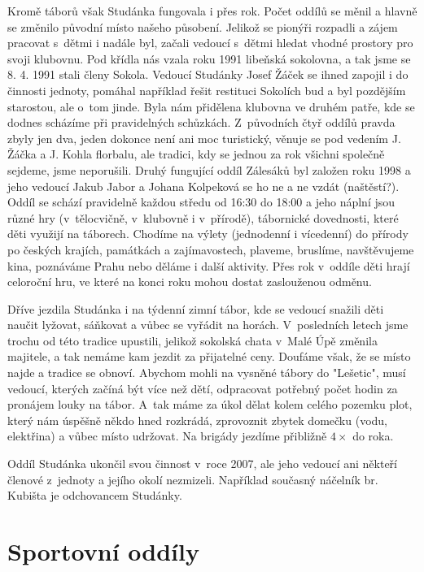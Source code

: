 \documentclass[a5paper, 11pt, twoside]{article}
\begin{document}
Kromě táborů však Studánka fungovala i přes rok. Počet oddílů se měnil a
hlavně se změnilo původní místo našeho působení. Jelikož se pionýři
rozpadli a zájem pracovat s~dětmi i nadále byl, začali vedoucí s~dětmi
hledat vhodné prostory pro svoji klubovnu. Pod křídla nás vzala roku
1991 libeňská sokolovna, a tak jsme se 8. 4. 1991 stali členy Sokola.
Vedoucí Studánky Josef Žáček se ihned zapojil i do činnosti jednoty,
pomáhal například řešit restituci Sokolích bud a byl pozdějším
starostou, ale o~tom jinde. Byla nám přidělena klubovna ve druhém patře,
kde se dodnes scházíme při pravidelných schůzkách. Z~původních čtyř
oddílů pravda zbyly jen dva, jeden dokonce není ani moc turistický,
věnuje se pod vedením J. Žáčka a J. Kohla florbalu, ale tradici, kdy se
jednou za rok všichni společně sejdeme, jsme neporušili. Druhý fungující
oddíl Zálesáků byl založen roku 1998 a jeho vedoucí Jakub Jabor a Johana
Kolpeková se ho ne a ne vzdát (naštěstí?). Oddíl se schází pravidelně
každou středu od 16:30 do 18:00 a jeho náplní jsou různé hry
(v~tělocvičně, v~klubovně i v~přírodě), tábornické dovednosti, které děti
využijí na táborech. Chodíme na výlety (jednodenní i vícedenní) do
přírody po českých krajích, památkách a zajímavostech, plaveme,
bruslíme, navštěvujeme kina, poznáváme Prahu nebo děláme i další
aktivity. Přes rok v~oddíle děti hrají celoroční hru, ve které na konci
roku mohou dostat zaslouženou odměnu.

Dříve jezdila Studánka i na týdenní zimní tábor, kde se vedoucí snažili
děti naučit lyžovat, sáňkovat a vůbec se vyřádit na horách. V~posledních
letech jsme trochu od této tradice upustili, jelikož sokolská chata
v~Malé Úpě změnila majitele, a tak nemáme kam jezdit za přijatelné ceny.
Doufáme však, že se místo najde a tradice se obnoví. Abychom mohli na
vysněné tábory do "Lešetic", musí vedoucí, kterých začíná být více než
dětí, odpracovat potřebný počet hodin za pronájem louky na tábor. A~tak
máme za úkol dělat kolem celého pozemku plot, který nám úspěšně někdo
hned rozkrádá, zprovoznit zbytek domečku (vodu, elektřina) a vůbec místo
udržovat. Na brigády jezdíme přibližně \(4\times\) do roka.

Oddíl Studánka ukončil svou činnost v~roce 2007, ale jeho vedoucí ani
někteří členové z~jednoty a jejího okolí nezmizeli. Například současný
náčelník br. Kubišta je odchovancem Studánky.

\section{Sportovní oddíly}
\end{document}
